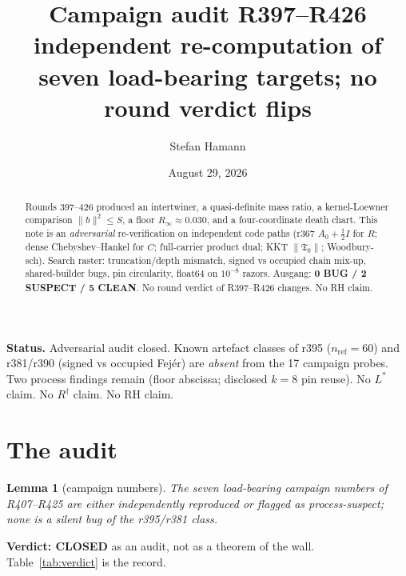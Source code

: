 \documentclass[11pt]{article}
\title{\bfseries Campaign audit R397--R426\\[2mm]
\large independent re-computation of seven load-bearing
targets; no round verdict flips}
\author{Stefan Hamann}
\date{August 29, 2026}
\newtheorem{lemma}{Lemma}
\theoremstyle{remark}
\newcommand{\Tnull}{\mathfrak{T}_0}
\begin{document}
\maketitle

\begin{abstract}\noindent
Rounds 397--426 produced an intertwiner, a
quasi-definite mass ratio, a kernel-Loewner
comparison $\|b\|^2\le S$, a floor
$R_\infty\approx 0.030$, and a four-coordinate
death chart.
This note is an \emph{adversarial} re-verification
on independent code paths (r367 $A_0+\tfrac12 I$
for $R$; dense Chebyshev--Hankel for $C$;
full-carrier product dual; KKT $\|\Tnull\|$;
Woodbury-sch).
Search raster: truncation/depth mismatch,
signed vs occupied chain mix-up, shared-builder
bugs, pin circularity, float64 on
$10^{-8}$ razors.
Ausgang: \textbf{0 BUG / 2 SUSPECT / 5 CLEAN}.
No round verdict of R397--R426 changes.
No RH claim.
\end{abstract}

\medskip\noindent
\textbf{Status.}\enspace
Adversarial audit closed.
Known artefact classes of r395 ($n_{\mathrm{ref}}=60$)
and r381/r390 (signed vs occupied Fej\'er) are
\emph{absent} from the 17 campaign probes.
Two process findings remain (floor abscissa;
disclosed $k=8$ pin reuse).
No $L^{*}$ claim.  No $R^{\dagger}$ claim.  No RH claim.

\section{The audit}\label{sec:lem}

\begin{lemma}[campaign numbers]\label{lem:audit}
The seven load-bearing campaign numbers of
R407--R425 are either independently reproduced
or flagged as process-suspect; none is a
silent bug of the r395/r381 class.
\end{lemma}

\noindent
\textbf{Verdict: CLOSED} as an audit, not as a
theorem of the wall.
Table~\ref{tab:verdict} is the record.
\end{document}
